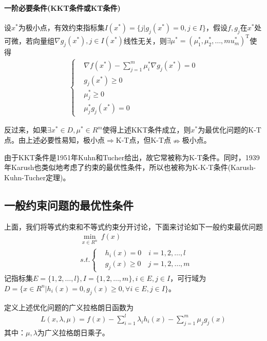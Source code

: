         \paragraph{一阶必要条件(KKT条件或KT条件)}
        设$x^*$为极小点，有效约束指标集$I(x^*)=\{j|g_j(x^*)=0,j \in I\}$，假设$f,g_j$在$x^*$处可微，若向量组${\nabla}{g_j}(x^*),j \in I(x^*)$线性无关，则$\exists {\mu}^*=({\mu}_1^*,{\mu}_2^*,\ldots,{mu}_m^*)^\mathrm{T} $使得
        \begin{align*}
        \left \{
        \begin{aligned}
        & \nabla f(x^*)-\mathop {\sum}\limits_{j=1}^m {\mu}^*_i{\nabla}{g_j}(x^*)=0\\
        & g_j(x^*) \geqslant 0\\
        & {\mu}^*_j \geqslant 0\\
        & {\mu}^*_j g_j(x^*)=0
        \end{aligned}
        \right.
        \end{align*}
        \par
        反过来，如果$\exists x^* \in D,{\mu}^* \in R^m$使得上述KKT条件成立，则$x^*$为最优化问题的K-T点。由上述必要性易知，极小点$\Rightarrow$K-T点，但K-T点$\nRightarrow$极小点。
        \par
        由于KKT条件是1951年Kuhn和Tucher给出，故它常被称为K-T条件。同时，1939年Karush也类似地考虑了约束的最优性条件，所以也被称为K-K-T条件(Karush-Kuhn-Tucher定理)。
    \subsection{一般约束问题的最优性条件}
        \par
        上面，我们将等式约束和不等式约束分开讨论，下面来讨论如下一般约束最优问题
        \begin{align*}
        &\mathop {\min}\limits_{x\in R^n} \ f(x)\\
        &s.t.\left\{
        \begin{aligned}
        &h_i(x)=0\quad i=1,2,\ldots,l\\
        &g_j(x) \geqslant 0\quad j=1,2,\ldots,m
        \end{aligned}
        \right.
        \end{align*}
        记指标集$E=\{1,2,\ldots,l\},I=\{1,2,\ldots,m\},i \in E,j \in I$，可行域为$D=\{x \in R^n|h_i(x)=0,g_j(x) \geqslant 0,\forall i \in E,j \in I\}$。
        \par
        定义上述优化问题的广义拉格朗日函数为
        \begin{align*}
        L(x,\lambda,\mu)=f(x)-\mathop {\sum}\limits_{i=1}^l {\lambda}_ih_i(x)-\mathop {\sum}\limits_{j=1}^m {\mu}_jg_j(x)
        \end{align*}
        其中：$\mu ,\lambda$为广义拉格朗日乘子。
